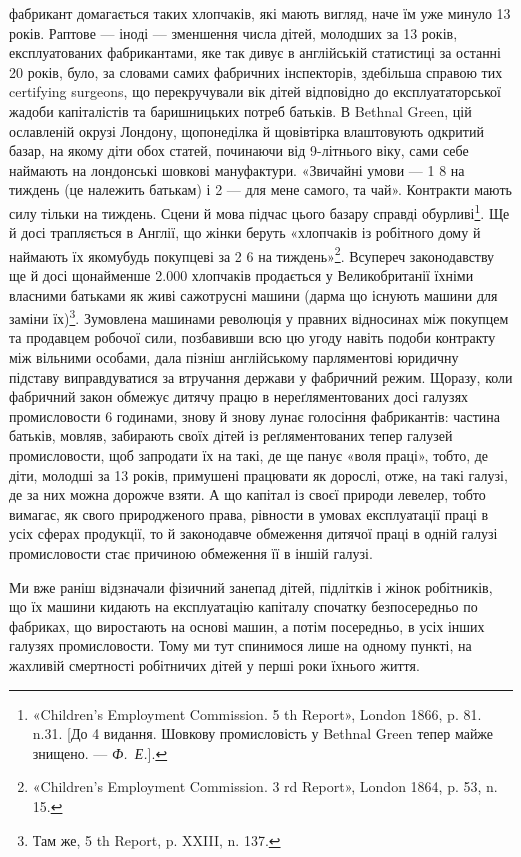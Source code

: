 \parcont{}  %
фабрикант домагається таких хлопчаків, які мають вигляд, наче
їм уже минуло 13 років. Раптове — іноді — зменшення числа
дітей, молодших за 13 років, експлуатованих фабрикантами, яке
так дивує в англійській статистиці за останні 20 років, було, за
словами самих фабричних інспекторів, здебільша справою тих
certifying surgeons, що перекручували вік дітей відповідно до
експлуататорської жадоби капіталістів та баришницьких потреб
батьків. В Bethnal Green, цій ославленій окрузі Лондону, щопонеділка
й щовівтірка влаштовують одкритий базар, на якому
діти обох статей, починаючи від 9-літнього віку, сами себе наймають
на лондонські шовкові мануфактури. «Звичайні умови —
1 8 на тиждень (це належить батькам) і 2 —
для мене самого, та чай». Контракти мають силу тільки на тиждень.
Сцени й мова підчас цього базару справді обурливі\footnote{
«Children’s Employment Commission. 5 th Report», London 1866,
p. 81. n.31. [До 4 видання. Шовкову промисловість у Bethnal Green тепер
майже знищено. — \emph{Ф.~Е.}].
}. Ще й досі
трапляється в Англії, що жінки беруть «хлопчаків із робітного
дому й наймають їх якомубудь покупцеві за 2
6 на тиждень»\footnote{
«Children’s Employment Commission. 3 rd Report», London 1864,
p. 53, n. 15.
}. Всупереч законодавству ще й досі щонайменше
\num{2.000} хлопчаків продається у Великобританії їхніми
власними батьками як живі сажотрусні машини (дарма що існують
машини для заміни їх)\footnote{
Там же, 5 th Report, p. XXIII, n. 137.
}. Зумовлена машинами революція у
правних відносинах між покупцем та продавцем робочої сили,
позбавивши всю цю угоду навіть подоби контракту між вільними
особами, дала пізніш англійському парляментові юридичну
підставу виправдуватися за втручання держави у фабричний
режим. Щоразу, коли фабричний закон обмежує дитячу працю
в нереґляментованих досі галузях промисловости 6 годинами,
знову й знову лунає голосіння фабрикантів: частина батьків,
мовляв, забирають своїх дітей із реґляментованих тепер галузей
промисловости, щоб запродати їх на такі, де ще панує «воля
праці», тобто, де діти, молодші за 13 років, примушені працювати
як дорослі, отже, на такі галузі, де за них можна дорожче
взяти. А що капітал із своєї природи левелер, тобто вимагає,
як свого природженого права, рівности в умовах експлуатації
праці в усіх сферах продукції, то й законодавче обмеження дитячої
праці в одній галузі промисловости стає причиною обмеження
її в іншій галузі.

Ми вже раніш відзначали фізичний занепад дітей, підлітків
і жінок робітників, що їх машини кидають на експлуатацію капіталу
спочатку безпосередньо по фабриках, що виростають на
основі машин, а потім посередньо, в усіх інших галузях промисловости.
Тому ми тут спинимося лише на одному пункті, на жахливій
смертності робітничих дітей у перші роки їхнього життя.
\parbreak{}  %
